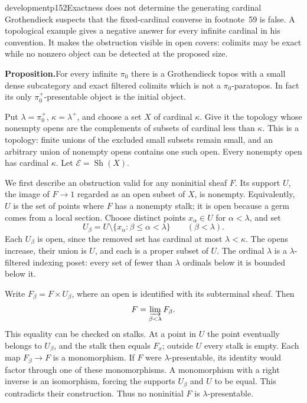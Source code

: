 \begin{dcomment}{development}{p152}{Exactness does not determine the generating cardinal}
Grothendieck suspects that the fixed-cardinal converse in footnote~59 is false. A topological example gives a negative answer for every infinite cardinal in his convention. It makes the obstruction visible in open covers: colimits may be exact while no nonzero object can be detected at the proposed size.

\textbf{Proposition.}\ours\quad For every infinite $\pi_0$ there is a Grothendieck topos with a small dense subcategory and exact filtered colimits which is not a $\pi_0$-paratopos. In fact its only $\pi_0^+$-presentable object is the initial object.

Put $\lambda=\pi_0^+$, $\kappa=\lambda^+$, and choose a set $X$ of cardinal $\kappa$. Give it the topology whose nonempty opens are the complements of subsets of cardinal less than $\kappa$. This is a topology: finite unions of the excluded small subsets remain small, and an arbitrary union of nonempty opens contains one such open. Every nonempty open has cardinal $\kappa$. Let $\mathcal E=\operatorname{Sh}(X)$.

We first describe an obstruction valid for any noninitial sheaf $F$. Its support $U$, the image of $F\to1$ regarded as an open subset of $X$, is nonempty. Equivalently, $U$ is the set of points where $F$ has a nonempty stalk; it is open because a germ comes from a local section. Choose distinct points $x_\alpha\in U$ for $\alpha<\lambda$, and set
\[
 U_\beta=U\setminus\{x_\alpha:\beta\leq\alpha<\lambda\}
 \qquad(\beta<\lambda).
\]
Each $U_\beta$ is open, since the removed set has cardinal at most $\lambda<\kappa$. The opens increase, their union is $U$, and each is a proper subset of $U$. The ordinal $\lambda$ is a $\lambda$-filtered indexing poset: every set of fewer than $\lambda$ ordinals below it is bounded below it.

Write $F_\beta=F\times U_\beta$, where an open is identified with its subterminal sheaf. Then
\[
 F=\varinjlim_{\beta<\lambda} F_\beta .
\]
This equality can be checked on stalks. At a point in $U$ the point eventually belongs to $U_\beta$, and the stalk then equals $F_x$; outside $U$ every stalk is empty. Each map $F_\beta\to F$ is a monomorphism. If $F$ were $\lambda$-presentable, its identity would factor through one of these monomorphisms. A monomorphism with a right inverse is an isomorphism, forcing the supports $U_\beta$ and $U$ to be equal. This contradicts their construction. Thus no noninitial $F$ is $\lambda$-presentable.


\end{dcomment}

